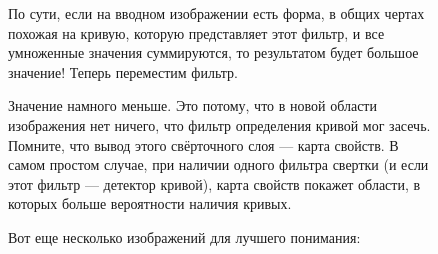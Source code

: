 \documentclass[paper=a4, fontsize=11pt]{scrartcl} %
\numberwithin{equation}{section} %
\numberwithin{figure}{section} %
\numberwithin{table}{section} %
\begin{document}
	\begin{figure}[h!]
			По сути, если на вводном изображении есть форма, в общих чертах похожая на кривую, которую представляет этот фильтр, и все умноженные значения суммируются, то результатом будет большое значение! Теперь переместим фильтр.
	\end{figure}



	\begin{figure}[h!]
	\end{figure}

	\begin{figure}[h!]
		Значение намного меньше. Это потому, что в новой области изображения нет ничего, что фильтр определения кривой мог засечь. Помните, что вывод этого свёрточного слоя — карта свойств. В самом простом случае, при наличии одного фильтра свертки (и если этот фильтр — детектор кривой), карта свойств покажет области, в которых больше вероятности наличия кривых.
		
		Вот еще несколько изображений для лучшего понимания:
	\end{figure}

	
	
	\begin{figure}[!h]
	\end{figure}
\end{document}
